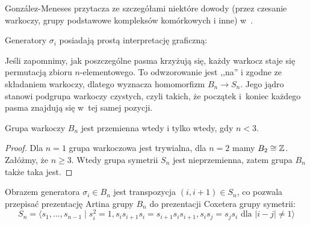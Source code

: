 González-Meneses przytacza ze szczegółami niektóre dowody (przez czesanie warkoczy, grupy podstawowe kompleksów komórkowych i inne) w~\cite{gonzalez11}.

Generatory $\sigma_i$ posiadają prostą interpretację graficzną:
\begin{comment}
\[
    \begin{tikzpicture}[baseline=-0.65ex, scale=0.2]
    \begin{knot}[clip width=5, end tolerance=1pt]
        \strand[semithick] (-8, -4.5) to (8, -4.5);
        \strand[semithick] [in=left,out=right] (-8, -1.5) to (8, 1.5);
        \strand[semithick] [in=left,out=right] (-8, 1.5) to (8, -1.5);
        \strand[semithick] (-8, 4.5) to (8, 4.5);
        \node at (-10, -4.5) {$1$};
        \node at (-10, -3) {$\ldots$};
        \node at (-10, -1.5) {$i$};
        \node at (-10, 1.5) {$i+1$};
        \node at (-10, 3) {$\ldots$};
        \node at (-10, 4.5) {$n$};
        \node at (0, 3) {$\ldots$};
        \node at (0, -3) {$\ldots$};
    \end{knot}
    \end{tikzpicture}
\]
\end{comment}

Jeśli zapomnimy, jak poszczególne pasma krzyżują się, każdy warkocz staje się permutacją zbioru $n$-elementowego.
To odwzorowanie jest ,,na'' i zgodne ze składaniem warkoczy, dlatego wyznacza homomorfizm $B_n \to S_n$.
%
Jego jądro stanowi podgrupa warkoczy czystych, czyli takich, że początek i~koniec każdego pasma znajdują się w~tej samej pozycji.

\begin{proposition}
    Grupa warkoczy $B_n$ jest przemienna wtedy i tylko wtedy, gdy $n < 3$.
\end{proposition}

\begin{proof}
    Dla $n = 1$ grupa warkoczowa jest trywialna, dla $n = 2$ mamy $B_2 \cong \mathbb Z$.
    Załóżmy, że $n \ge 3$. Wtedy grupa symetrii $S_n$ jest nieprzemienna, zatem grupa $B_n$ także taka jest.
\end{proof}

Obrazem generatora $\sigma_i \in B_n$ jest transpozycja $(i, i+1) \in S_n$, co pozwala przepisać prezentację Artina grupy $B_n$ do prezentacji Coxetera grupy symetrii:
\begin{equation}
    S_n = \langle s_1, \ldots, s_{n-1} \mid
    s_i^2 = 1,
    s_{i}s_{i+1}s_{i} = s_{i+1}s_{i}s_{i+1},
    s_is_j = s_js_i \mbox { dla } |i-j| \neq 1 \rangle
\end{equation}

